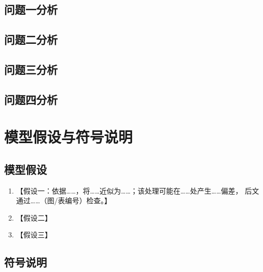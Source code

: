 \documentclass[bwprint]{gmcmthesis}
\numberwithin{equation}{section}
\numberwithin{figure}{section}
\numberwithin{table}{section}
\begin{document}

\subsection{问题一分析}

\subsection{问题二分析}

\subsection{问题三分析}

\subsection{问题四分析}


\section{模型假设与符号说明}

\subsection{模型假设}

\begin{enumerate}
\item 【假设一：依据……，将……近似为……；该处理可能在……处产生……偏差，
      后文通过……（图/表编号）检查。】
\item 【假设二】
\item 【假设三】
\end{enumerate}

\subsection{符号说明}

\end{document}
